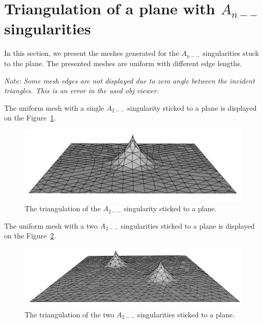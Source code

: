 \clearpage
\section{Triangulation of a plane with $A_{n--}$ singularities}
In this section, we present the meshes generated for the $A_{n--}$ singularities stuck to the plane. The presented meshes are uniform with different edge lengths.

\textit{Note: Some mesh edges are not displayed due to zero angle between the incident
triangles. This is an error in the used obj viewer.}

The uniform mesh with a single $A_{2--}$ singularity sticked to a plane is displayed
on the Figure~\ref{img:84}.

\begin{figure}[h!]
    \centerline{\includegraphics[scale=0.5]{images/img84}}
    \caption[The triangulation of the $A_{2--}$ singularity sticked to a plane]
    {The triangulation of the $A_{2--}$ singularity sticked to a plane.}
    \label{img:84}
\end{figure}

The uniform mesh with a two $A_{2--}$ singularities sticked to a plane is displayed
on the Figure~\ref{img:85}.

\begin{figure}[h!]
    \centerline{\includegraphics[scale=0.5]{images/img85}}
    \caption[The triangulation of the two $A_{2--}$ singularities sticked to a plane]
    {The triangulation of the two $A_{2--}$ singularities sticked to a plane.}
    \label{img:85}
\end{figure}

